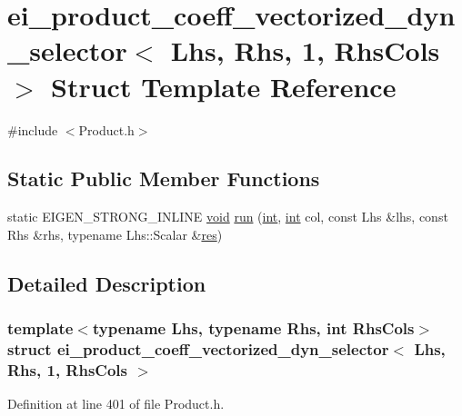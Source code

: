 \hypertarget{structei__product__coeff__vectorized__dyn__selector_3_01_lhs_00_01_rhs_00_011_00_01_rhs_cols_01_4}{\section{ei\-\_\-product\-\_\-coeff\-\_\-vectorized\-\_\-dyn\-\_\-selector$<$ Lhs, Rhs, 1, Rhs\-Cols $>$ Struct Template Reference}
\label{structei__product__coeff__vectorized__dyn__selector_3_01_lhs_00_01_rhs_00_011_00_01_rhs_cols_01_4}
}


{\ttfamily \#include $<$Product.\-h$>$}

\subsection*{Static Public Member Functions}
\begin{DoxyCompactItemize}
\item 
static E\-I\-G\-E\-N\-\_\-\-S\-T\-R\-O\-N\-G\-\_\-\-I\-N\-L\-I\-N\-E \hyperlink{group___u_a_v_objects_plugin_ga444cf2ff3f0ecbe028adce838d373f5c}{void} \hyperlink{structei__product__coeff__vectorized__dyn__selector_3_01_lhs_00_01_rhs_00_011_00_01_rhs_cols_01_4_a6f42c1fb4379dc877c3f597fa5a9fa22}{run} (\hyperlink{ioapi_8h_a787fa3cf048117ba7123753c1e74fcd6}{int}, \hyperlink{ioapi_8h_a787fa3cf048117ba7123753c1e74fcd6}{int} col, const Lhs \&lhs, const Rhs \&rhs, typename Lhs\-::\-Scalar \&\hyperlink{glext_8h_a1dbb21208b9047cc8031ca9c840d3c2f}{res})
\end{DoxyCompactItemize}


\subsection{Detailed Description}
\subsubsection*{template$<$typename Lhs, typename Rhs, int Rhs\-Cols$>$struct ei\-\_\-product\-\_\-coeff\-\_\-vectorized\-\_\-dyn\-\_\-selector$<$ Lhs, Rhs, 1, Rhs\-Cols $>$}



Definition at line 401 of file Product.\-h.



